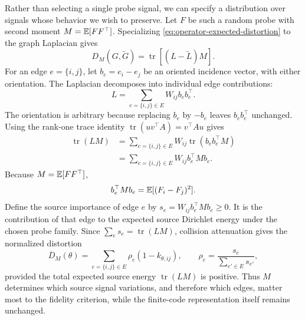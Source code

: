 Rather than selecting a single probe signal, we can specify a distribution over signals whose behavior we wish to preserve.
Let $F$ be such a random probe with second moment $M=\mathbb{E}[FF^\top]$.
Specializing \cref{eq:operator-expected-distortion} to the graph Laplacian gives
\[
D_M(G,\widetilde G)=\operatorname{tr}[(L-\widetilde L)M].
\]
For an edge $e=\{i,j\}$, let $b_e=e_i-e_j$ be an oriented incidence vector, with either orientation.
The Laplacian decomposes into individual edge contributions:
\[
L
=
\sum_{e=\{i,j\}\in E}W_{ij}b_eb_e^\top.
\]
The orientation is arbitrary because replacing $b_e$ by $-b_e$ leaves $b_eb_e^\top$ unchanged.
Using the rank-one trace identity $\operatorname{tr}(uv^\top A)=v^\top Au$ gives
\begin{align*}
\operatorname{tr}(LM)
&=
\sum_{e=\{i,j\}\in E}
W_{ij}\operatorname{tr}(b_eb_e^\top M)\\
&=
\sum_{e=\{i,j\}\in E}
W_{ij}b_e^\top M b_e.
\end{align*}
Because $M=\mathbb{E}[FF^\top]$,
\[
b_e^\top M b_e
=
\mathbb{E}[(F_i-F_j)^2].
\]
Define the source importance of edge $e$ by $s_e=W_{ij}b_e^\top M b_e\ge0$.
It is the contribution of that edge to the expected source Dirichlet energy under the chosen probe family.
Since $\sum_e s_e=\operatorname{tr}(LM)$, collision attenuation gives the normalized distortion
\begin{equation}
\overline D_M(\theta)
=\sum_{e=\{i,j\}\in E}\rho_e(1-k_{\theta,ij}),\qquad
\rho_e=\frac{s_e}{\sum_{e'\in E}s_{e'}},
\label{eq:probe-edge-family}
\end{equation}
provided the total expected source energy $\operatorname{tr}(LM)$ is positive.
Thus $M$ determines which source signal variations, and therefore which edges, matter most to the fidelity criterion, while the finite-code representation itself remains unchanged.

